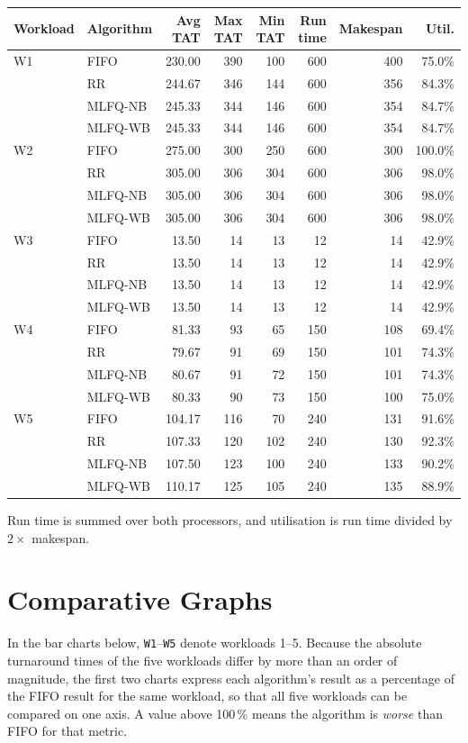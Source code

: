 \documentclass[11pt,a4paper]{article}
\begin{document}
\begin{center}\small
\begin{tabular}{llrrrrrr}
\toprule
\textbf{Workload} & \textbf{Algorithm} & \textbf{Avg TAT} & \textbf{Max TAT} &
\textbf{Min TAT} & \textbf{Run time} & \textbf{Makespan} & \textbf{Util.} \\
\midrule
W1 & FIFO & 230.00 & 390 & 100 & 600 & 400 & 75.0\% \\
 & RR & 244.67 & 346 & 144 & 600 & 356 & 84.3\% \\
 & MLFQ-NB & 245.33 & 344 & 146 & 600 & 354 & 84.7\% \\
 & MLFQ-WB & 245.33 & 344 & 146 & 600 & 354 & 84.7\% \\
\midrule
W2 & FIFO & 275.00 & 300 & 250 & 600 & 300 & 100.0\% \\
 & RR & 305.00 & 306 & 304 & 600 & 306 & 98.0\% \\
 & MLFQ-NB & 305.00 & 306 & 304 & 600 & 306 & 98.0\% \\
 & MLFQ-WB & 305.00 & 306 & 304 & 600 & 306 & 98.0\% \\
\midrule
W3 & FIFO & 13.50 & 14 & 13 & 12 & 14 & 42.9\% \\
 & RR & 13.50 & 14 & 13 & 12 & 14 & 42.9\% \\
 & MLFQ-NB & 13.50 & 14 & 13 & 12 & 14 & 42.9\% \\
 & MLFQ-WB & 13.50 & 14 & 13 & 12 & 14 & 42.9\% \\
\midrule
W4 & FIFO & 81.33 & 93 & 65 & 150 & 108 & 69.4\% \\
 & RR & 79.67 & 91 & 69 & 150 & 101 & 74.3\% \\
 & MLFQ-NB & 80.67 & 91 & 72 & 150 & 101 & 74.3\% \\
 & MLFQ-WB & 80.33 & 90 & 73 & 150 & 100 & 75.0\% \\
\midrule
W5 & FIFO & 104.17 & 116 & 70 & 240 & 131 & 91.6\% \\
 & RR & 107.33 & 120 & 102 & 240 & 130 & 92.3\% \\
 & MLFQ-NB & 107.50 & 123 & 100 & 240 & 133 & 90.2\% \\
 & MLFQ-WB & 110.17 & 125 & 105 & 240 & 135 & 88.9\% \\
\bottomrule\end{tabular}\end{center}
\noindent Run time is summed over both processors, and utilisation is run time divided by $2\times$ makespan.
\section{Comparative Graphs}
In the bar charts below, \texttt{W1}--\texttt{W5} denote workloads 1--5.
Because the absolute turnaround times of the five workloads differ by more than an order
of magnitude, the first two charts express each algorithm's result as a percentage of the
FIFO result for the same workload, so that all five workloads can be compared on one
axis. A value above 100\,\% means the algorithm is \emph{worse} than FIFO for that metric.
\end{document}
